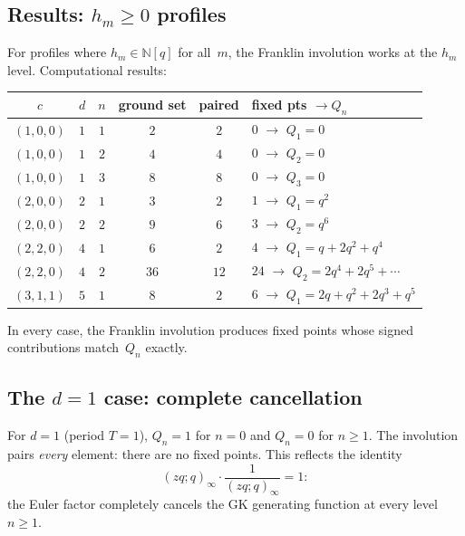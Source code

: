 \documentclass[11pt]{article}
\newcommand{\N}{\mathbb{N}}
\newcommand{\qpoch}[2]{(#1;#2)_\infty}
\theoremstyle{plain}
\theoremstyle{definition}
\begin{document}
\subsection{Results: $h_m \geq 0$ profiles}

For profiles where $h_m \in \N[q]$ for all~$m$, the
Franklin involution works at the $h_m$ level.
Computational results:

\medskip
\begin{center}
\begin{tabular}{c|c|c|c|c|l}
$c$ & $d$ & $n$ &
  \textbf{ground set} & \textbf{paired} &
  \textbf{fixed pts} $\to Q_n$ \\ \hline
$(1,0,0)$ & $1$ & $1$ & $2$ & $2$ &
  $0$ \;$\to$\; $Q_1 = 0$ \\
$(1,0,0)$ & $1$ & $2$ & $4$ & $4$ &
  $0$ \;$\to$\; $Q_2 = 0$ \\
$(1,0,0)$ & $1$ & $3$ & $8$ & $8$ &
  $0$ \;$\to$\; $Q_3 = 0$ \\
$(2,0,0)$ & $2$ & $1$ & $3$ & $2$ &
  $1$ \;$\to$\; $Q_1 = q^2$ \\
$(2,0,0)$ & $2$ & $2$ & $9$ & $6$ &
  $3$ \;$\to$\; $Q_2 = q^6$ \\
$(2,2,0)$ & $4$ & $1$ & $6$ & $2$ &
  $4$ \;$\to$\; $Q_1 = q + 2q^2 + q^4$ \\
$(2,2,0)$ & $4$ & $2$ & $36$ & $12$ &
  $24$ \;$\to$\; $Q_2 = 2q^4 + 2q^5 + \cdots$ \\
$(3,1,1)$ & $5$ & $1$ & $8$ & $2$ &
  $6$ \;$\to$\; $Q_1 = 2q + q^2 + 2q^3 + q^5$ \\
\end{tabular}
\end{center}

\medskip
\noindent
In every case, the Franklin involution produces fixed
points whose signed contributions match~$Q_n$ exactly.


\subsection{The $d = 1$ case: complete cancellation}

For $d = 1$ (period $T = 1$), $Q_n = 1$ for $n = 0$
and $Q_n = 0$ for $n \geq 1$.  The involution pairs
\emph{every} element: there are no fixed points.  This
reflects the identity
\begin{equation}\label{eq:d1-cancel}
  \qpoch{zq}{q} \cdot \frac{1}{\qpoch{zq}{q}} = 1:
\end{equation}
the Euler factor completely cancels the GK generating
function at every level $n \geq 1$.
\end{document}
